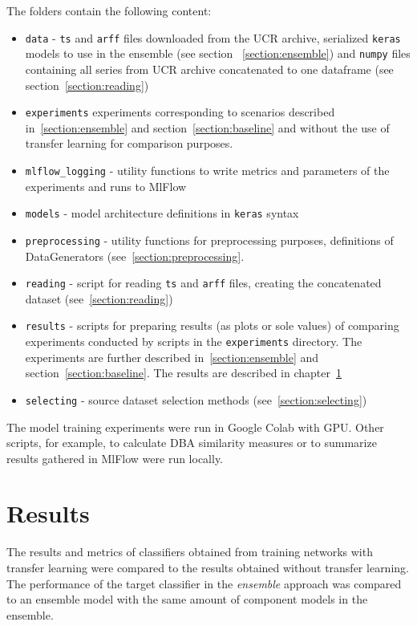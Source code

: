 \documentclass[a4paper,11pt,twoside]{report}
\theoremstyle{definition}
\begin{document}
The folders contain the following content:
\begin{itemize}
\item \texttt{data} - \texttt{ts} and \texttt{arff} files downloaded from the UCR archive,   serialized \texttt{keras} models to use in the ensemble (see section ~\ref{section:ensemble}) and \texttt{numpy} files containing all series from UCR archive concatenated to one dataframe (see section~\ref{section:reading})
\item \texttt{experiments}  experiments corresponding to scenarios described in~\ref{section:ensemble} and section~\ref{section:baseline} and without the use of transfer learning for comparison purposes.
\item \texttt{mlflow\_logging} - utility functions to write metrics and parameters of the experiments and runs to MlFlow
\item \texttt{models} - model architecture definitions in \texttt{keras} syntax
\item \texttt{preprocessing} - utility functions for preprocessing purposes, definitions of DataGenerators (see~\ref{section:preprocessing}.
\item \texttt{reading} - script for reading \texttt{ts} and \texttt{arff} files, creating the concatenated dataset (see~\ref{section:reading})
\item \texttt{results} - scripts for preparing results (as plots or sole values) of comparing experiments conducted by scripts in the \texttt{experiments} directory. The experiments are further described in~\ref{section:ensemble} and section~\ref{section:baseline}. The results are described in chapter~\ref{chapter:results}
\item \texttt{selecting} - source dataset selection methods (see~\ref{section:selecting})

\end{itemize}

The model training experiments were run in Google Colab with GPU. Other scripts, for example, to calculate DBA similarity measures or to summarize results gathered in MlFlow were run locally.
\chapter{Results}\label{chapter:results}
The results and metrics of classifiers obtained from training networks with transfer learning were compared to the results obtained without transfer learning. The performance of the target classifier in the\textit{ ensemble }approach was compared to an ensemble model with the same amount of component models in the ensemble.
\end{document}
